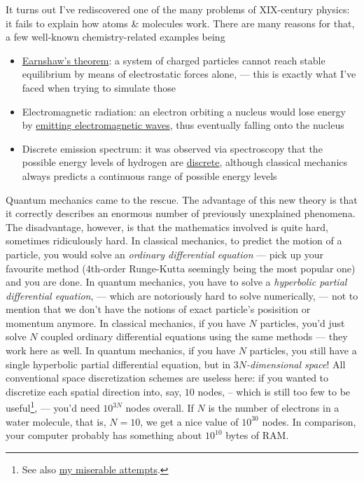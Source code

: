 \documentclass{article}
\begin{document}
It turns out I've rediscovered one of the many problems of XIX-century physics: it fails to explain how atoms \& molecules work. There are many reasons for that, a few well-known chemistry-related examples being

\begin{itemize}
\item \href{https://en.wikipedia.org/wiki/Earnshaw's_theorem}{Earnshaw's theorem}: a system of charged particles cannot reach stable equilibrium by means of electrostatic forces alone, --- this is exactly what I've faced when trying to simulate those
\item Electromagnetic radiation: an electron orbiting a nucleus would lose energy by \href{https://en.wikipedia.org/wiki/Larmor_formula}{emitting electromagnetic waves}, thus eventually falling onto the nucleus
\item Discrete emission spectrum: it was observed via spectroscopy that the possible energy levels of hydrogen are \href{https://en.wikipedia.org/wiki/Hydrogen_spectral_series}{discrete}, although classical mechanics always predicts a continuous range of possible energy levels
\end{itemize}

Quantum mechanics came to the rescue. The advantage of this new theory is that it correctly describes an enormous number of previously unexplained phenomena. The disadvantage, however, is that the mathematics involved is quite hard, sometimes ridiculously hard. In classical mechanics, to predict the motion of a particle, you would solve an \textit{ordinary differential equation} --- pick up your favourite method (4th-order Runge-Kutta seemingly being the most popular one) and you are done. In quantum mechanics, you have to solve a \textit{hyperbolic partial differential equation}, --- which are notoriously hard to solve numerically, --- not to mention that we don't have the notions of exact particle's posisition or momentum anymore. In classical mechanics, if you have \(N\) particles, you'd just solve \(N\) coupled ordinary differential equations using the same methods --- they work here as well. In quantum mechanics, if you have \(N\) particles, you still have a single hyperbolic partial differential equation, but in \textit{\(3N\)-dimensional space}! All conventional space discretization schemes are useless here: if you wanted to discretize each spatial direction into, say, \(10\) nodes, -- which is still too few to be useful\footnote{See also \href{https://twitter.com/lisyarus/status/1098302494470520832}{my miserable attempts}.}, --- you'd need \(10^{3N}\) nodes overall. If \(N\) is the number of electrons in a water molecule, that is, \(N=10\), we get a nice value of \(10^{30}\) nodes. In comparison, your computer probably has something about \(10^{10}\) bytes of RAM.
\end{document}
